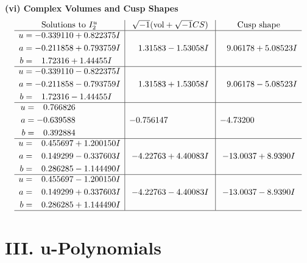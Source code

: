 \documentclass[1p]{elsarticle_modified}
\theoremstyle{definition}
\newcommand{\I}{\sqrt{-1}}
\begin{document}
\newpage\flushleft \textbf{(vi) Complex Volumes and Cusp Shapes}
$$\begin{array}{c|c|c}  
\text{Solutions to }I^u_{2}& \I (\text{vol} + \sqrt{-1}CS) & \text{Cusp shape}\\
 \hline 
\begin{aligned}
u &= -0.339110 + 0.822375 I \\
a &= -0.211858 + 0.793759 I \\
b &= \phantom{-}1.72316 + 1.44455 I\end{aligned}
 & \phantom{-}1.31583 - 1.53058 I & \phantom{-}9.06178 + 5.08523 I \\ \hline\begin{aligned}
u &= -0.339110 - 0.822375 I \\
a &= -0.211858 - 0.793759 I \\
b &= \phantom{-}1.72316 - 1.44455 I\end{aligned}
 & \phantom{-}1.31583 + 1.53058 I & \phantom{-}9.06178 - 5.08523 I \\ \hline\begin{aligned}
u &= \phantom{-}0.766826\phantom{ +0.000000I} \\
a &= -0.639588\phantom{ +0.000000I} \\
b &= \phantom{-}0.392884\phantom{ +0.000000I}\end{aligned}
 & -0.756147\phantom{ +0.000000I} & -4.73200\phantom{ +0.000000I} \\ \hline\begin{aligned}
u &= \phantom{-}0.455697 + 1.200150 I \\
a &= \phantom{-}0.149299 - 0.337603 I \\
b &= \phantom{-}0.286285 - 1.144490 I\end{aligned}
 & -4.22763 + 4.40083 I & -13.0037 + 8.9390 I \\ \hline\begin{aligned}
u &= \phantom{-}0.455697 - 1.200150 I \\
a &= \phantom{-}0.149299 + 0.337603 I \\
b &= \phantom{-}0.286285 + 1.144490 I\end{aligned}
 & -4.22763 - 4.40083 I & -13.0037 - 8.9390 I\\
 \hline 
 \end{array}$$\newpage
\newpage\renewcommand{\arraystretch}{1}
\centering \section*{ III. u-Polynomials}
\end{document}
